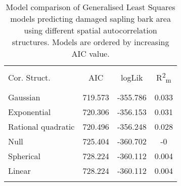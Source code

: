 
\begin{table}[H] \centering 
  \caption{Model comparison of Generalised Least Squares models predicting damaged sapling bark area using different spatial autocorrelation structures. Models are ordered by increasing AIC value.} 
  \label{cor_table} 
\begin{tabular}{@{\extracolsep{5pt}} lS[table-format=3.2]S[table-format=3.2]S[table-format=3.2]} 
\\[-1.8ex]\hline 
\hline \\[-1.8ex] 
{Cor. Struct.} & {AIC} & {logLik} & {R\textsuperscript{2}\textsubscript{m}} \\
\hline \\[-1.8ex] 
Gaussian & 719.573 & -355.786 & 0.033 \\ 
Exponential & 720.306 & -356.153 & 0.031 \\ 
Rational quadratic & 720.496 & -356.248 & 0.028 \\ 
Null & 725.404 & -360.702 & -0 \\ 
Spherical & 728.224 & -360.112 & 0.004 \\ 
Linear & 728.224 & -360.112 & 0.004 \\ 
\hline \\[-1.8ex] 
\end{tabular} 
\end{table} 
